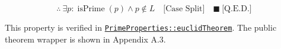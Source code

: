 \begin{equation*}
\therefore\ \exists p:\operatorname{isPrime}(p)\land p\notin L
\quad \text{[Case Split]}\quad\blacksquare\ \text{[Q.E.D.]}
\end{equation*}

This property is verified in
\href{https://github.com/thiagomata/prime-numbers/blob/euclid-theorem-article-v1.0.0/src/main/scala/v1/chapter5/prime/properties/PrimeProperties.scala}{\texttt{PrimeProperties::euclidTheorem}}.
The public theorem wrapper is shown in Appendix A.3.
